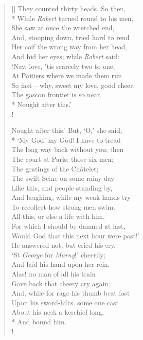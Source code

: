 \documentclass[MAIN]{subfiles}
\begin{document}
\begin{verse}[\versewidth]
{\color{white} They counted thirty heads.} So then,\\*
While \emph{Robert} turned round to his men,\\
She saw at once the wretched end,\\
And, stooping down, tried hard to rend\\
Her coif the wrong way from her head,\\
And hid her eyes; while \emph{Robert} said:\\
`Nay, love, 'tis scarcely two to one,\\
At {\sc Poitiers} where we made them run\\
So fast -- why, sweet my love, good cheer,\\
The gascon frontier is so near,\\*
Nought after this.'\\!

{\color{white} Nought after this.'} But, `O,' she said,\\*
`My God! my God! I have to tread\\
The long way back without you; then\\
The court at {\sc Paris}; those six men;\\
The gratings of the {\sc Ch\^atelet};\\
The swift {\sc Seine} on some rainy day\\
Like this, and people standing by,\\
And laughing, while my weak hands try\\
To recollect how strong men swim.\\
All this, or else a life with him,\\
For which I should be damned at last,\\
Would God that this next hour were past!'\\
He answered not, but cried his cry,\\
`St \emph{George} for \emph{Marny}!' cheerily;\\
And laid his hand upon her rein.\\
Alas! no man of all his train\\
Gave back that cheery cry again;\\
And, while for rage his thumb beat fast\\
Upon his sword-hilts, some one cast\\
About his neck a kerchief long,\\*
And bound him.\\!


\end{verse}
\end{document}
